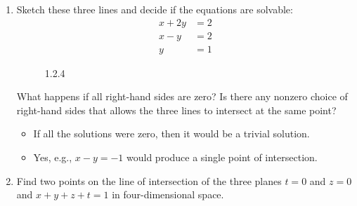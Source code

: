 \begin{itemize}
\begin{enumerate}
    \item Sketch these three lines and decide if the equations are solvable:
      \begin{align*}
        x + 2y &= 2 \\
        x - y &= 2 \\
        y &= 1
      \end{align*}
      \vspace{-30pt}
      \begin{figure}[h]
        \centering
        \caption{1.2.4}
      \end{figure}


      What happens if all right-hand sides are zero? Is there any nonzero
      choice of right-hand sides that allows the three lines to intersect at
      the same point?
      \begin{itemize}\color{foreground}
        \item If all the solutions were zero, then it would be a trivial
          solution.
        \item Yes, e.g., \( x - y = -1 \) would produce a single point of
          intersection.
      \end{itemize}

    \item Find two points on the line of intersection of the three planes \( t
      = 0 \) and \( z = 0 \) and \( x+y+z+t = 1 \) in four-dimensional space.

     \fg{\[
        \begin{bmatrix} 1 \\ 0 \\ 0 \\ 0 \end{bmatrix} \qquad
        \begin{bmatrix} 0 \\ 1 \\ 0 \\ 0  \end{bmatrix}
     \]}


\end{enumerate}
\end{itemize}
